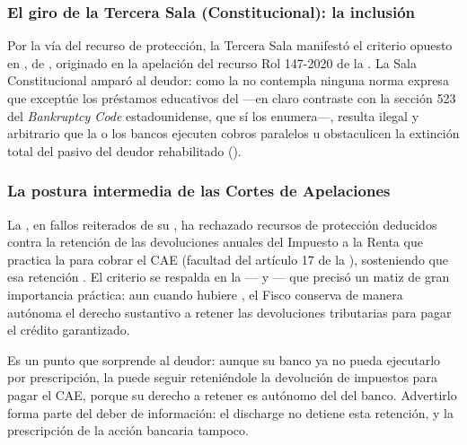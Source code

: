 \subsubsection{El giro de la Tercera Sala (Constitucional): la inclusión}

Por la vía del recurso de protección, la Tercera Sala manifestó el criterio opuesto en
, de  \parencite{juris-mancilla-tgr}, originado en la apelación del recurso Rol 147-2020 de la
. La Sala Constitucional amparó al deudor: como la \LIR{} no contempla ninguna
norma expresa que exceptúe los préstamos educativos del \discharge{} ---en claro contraste con
la sección 523 del \emph{Bankruptcy Code} estadounidense, que sí los enumera---, resulta ilegal
y arbitrario que la \tgr{} o los bancos ejecuten cobros paralelos u obstaculicen la extinción
total del pasivo del deudor rehabilitado ().

\subsubsection{La postura intermedia de las Cortes de Apelaciones}

La , en fallos reiterados de su , ha rechazado recursos de
protección deducidos contra la retención de las devoluciones anuales del Impuesto a la Renta que
practica la \tgr{} para cobrar el CAE (facultad del artículo 17 de la \Lcae{}), sosteniendo que esa
retención . El criterio se respalda en la \csup{}
--- y --- que precisó un matiz de gran importancia práctica: aun
cuando hubiere , el Fisco conserva de manera
autónoma el derecho sustantivo a retener las devoluciones tributarias para pagar el crédito
garantizado.

\begin{alerta}
Es un punto que sorprende al deudor: aunque su banco ya no pueda ejecutarlo por prescripción, la
\tgr{} puede seguir reteniéndole la devolución de impuestos para pagar el CAE, porque su derecho a
retener es autónomo del del banco. Advertirlo forma parte del deber de información: el discharge no
detiene esta retención, y la prescripción de la acción bancaria tampoco.
\end{alerta}

